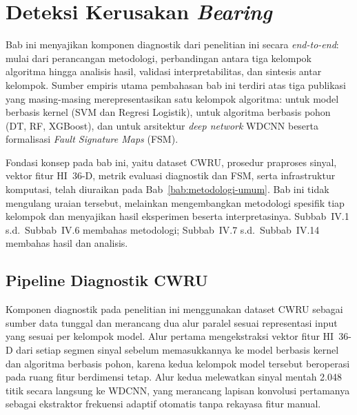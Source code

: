 
\chapter{Deteksi Kerusakan \emph{Bearing}}
\label{bab:diagnostik}

Bab ini menyajikan {\color{blue}komponen diagnostik} dari penelitian ini secara \emph{end-to-end}: mulai dari perancangan
metodologi, perbandingan antara tiga kelompok algoritma hingga analisis
hasil, validasi interpretabilitas, dan sintesis antar kelompok.
Sumber empiris utama pembahasan bab ini terdiri atas tiga publikasi yang masing-masing merepresentasikan
satu kelompok algoritma:  untuk model
berbasis kernel (SVM dan Regresi Logistik), 
untuk algoritma berbasis pohon (DT, RF, XGBoost), dan
 untuk arsitektur \emph{deep network} WDCNN
beserta formalisasi \emph{Fault Signature Maps} (FSM).

Fondasi konsep pada bab ini, yaitu dataset CWRU, prosedur praproses sinyal, vektor
fitur HI~36-D, metrik evaluasi diagnostik dan FSM, serta infrastruktur
komputasi, telah diuraikan pada Bab~\ref{bab:metodologi-umum}.
Bab ini tidak mengulang uraian tersebut, melainkan mengembangkan metodologi
spesifik tiap kelompok dan menyajikan hasil eksperimen beserta interpretasinya.
Subbab~IV.1 s.d.\ Subbab~IV.6 membahas metodologi; Subbab~IV.7 s.d.\ Subbab~IV.14
membahas hasil dan analisis.

\section{Pipeline Diagnostik CWRU}
\label{sec:bab4_pipeline}

Komponen diagnostik pada penelitian ini menggunakan dataset CWRU sebagai
sumber data tunggal dan merancang dua alur paralel sesuai representasi
input yang sesuai per kelompok model.
Alur pertama mengekstraksi vektor fitur HI~36-D dari setiap segmen sinyal
sebelum memasukkannya ke model berbasis kernel dan algoritma berbasis pohon,
karena kedua kelompok model tersebut beroperasi pada ruang fitur berdimensi tetap.
Alur kedua melewatkan sinyal mentah 2.048 titik secara langsung ke WDCNN,
yang merancang lapisan konvolusi pertamanya sebagai ekstraktor frekuensi
adaptif otomatis tanpa rekayasa fitur manual.


